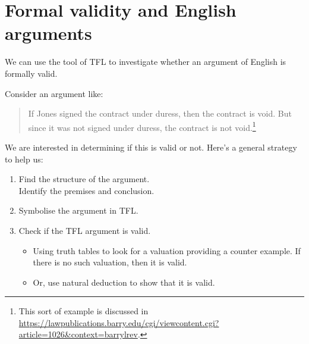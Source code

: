 \chapter{Formal validity and English arguments}

We can use the tool of TFL to investigate whether an argument of English is formally valid.

Consider an argument like:
\begin{quote}
If Jones signed the contract under duress, then the contract is void. But since it was not signed under duress, the contract is not void.\footnote{
This sort of example is discussed in \url{https://lawpublications.barry.edu/cgi/viewcontent.cgi?article=1026&context=barrylrev}.}
\end{quote}

We are interested in determining if this is valid or not. Here's a general strategy to help us:
\begin{highlighted}\begin{enumerate}
\item Find the structure of the argument. \\Identify the premises and conclusion.
\item \label{itm:validity-symbolise}Symbolise the argument in TFL.
\item \label{itm:validity-TTs} Check if the TFL argument is valid.\begin{itemize}\item Using truth tables to look for a valuation providing a counter example. If there is no such valuation, then it is valid.
\item Or, use natural deduction to show that it is valid.
\end{itemize}
\end{enumerate}
\end{highlighted}

